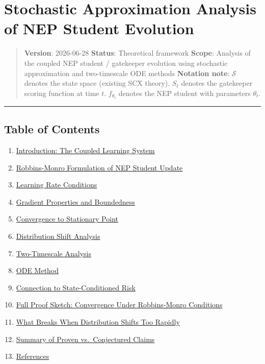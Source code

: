 \documentclass[
  12pt,
]{article}
\author{SCX}
\date{2026}
\providecommand{\tightlist}{%
  \setlength{\itemsep}{0pt}\setlength{\parskip}{0pt}}
\begin{document}
\section{Stochastic Approximation Analysis of NEP Student
Evolution}\label{stochastic-approximation-analysis-of-nep-student-evolution}

\begin{quote}
\textbf{Version}: 2026-06-28 \textbar{} \textbf{Status}: Theoretical
framework \textbar{} \textbf{Scope}: Analysis of the coupled NEP student
/ gatekeeper evolution using stochastic approximation and two-timescale
ODE methods \textbf{Notation note}: \(\mathcal{S}\) denotes the state
space (existing SCX theory). \(S_t\) denotes the gatekeeper scoring
function at time \(t\). \(f_{\theta_t}\) denotes the NEP student with
parameters \(\theta_t\).
\end{quote}

\begin{center}\rule{0.5\linewidth}{0.5pt}\end{center}

\subsection{Table of Contents}\label{table-of-contents}

\begin{enumerate}
\def\labelenumi{\arabic{enumi}.}
\tightlist
\item
  \hyperref[1-introduction-the-coupled-learning-system]{Introduction:
  The Coupled Learning System}
\item
  \hyperref[2-robbins-monro-formulation-of-nep-student-update]{Robbins-Monro
  Formulation of NEP Student Update}
\item
  \hyperref[3-learning-rate-conditions]{Learning Rate Conditions}
\item
  \hyperref[4-gradient-properties-and-boundedness]{Gradient Properties
  and Boundedness}
\item
  \hyperref[5-convergence-to-stationary-point]{Convergence to Stationary
  Point}
\item
  \hyperref[6-distribution-shift-analysis]{Distribution Shift Analysis}
\item
  \hyperref[7-two-timescale-analysis]{Two-Timescale Analysis}
\item
  \hyperref[8-ode-method]{ODE Method}
\item
  \hyperref[9-connection-to-state-conditioned-risk]{Connection to
  State-Conditioned Risk}
\item
  \hyperref[10-full-proof-sketch-convergence-under-robbins-monro-conditions]{Full
  Proof Sketch: Convergence Under Robbins-Monro Conditions}
\item
  \hyperref[11-what-breaks-when-distribution-shifts-too-rapidly]{What
  Breaks When Distribution Shifts Too Rapidly}
\item
  \hyperref[12-summary-of-proven-vs-conjectured-claims]{Summary of
  Proven vs.~Conjectured Claims}
\item
  \hyperref[13-references]{References}
\end{enumerate}
\end{document}
